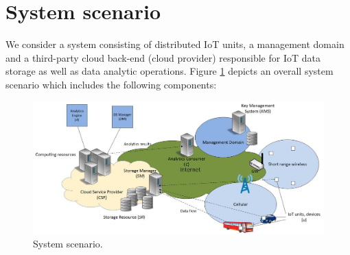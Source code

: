 {\section{System scenario}
\label{Systemscenario}
We consider a system consisting of distributed IoT units, a management domain and a third-party cloud back-end (cloud provider) responsible for IoT data storage as well as data analytic operations.  Figure \ref{fig:systemarchitecture} depicts an overall system scenario which includes the following components: 

\begin{figure}[th]
    \centering
    \includegraphics[width=400pt]{papers/ppiot/images/SystemArch}
    \caption{System scenario.}
    \label{fig:systemarchitecture}
\end{figure}

}
